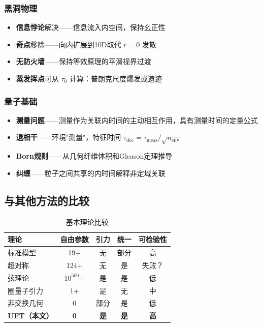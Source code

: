 \subsubsection{黑洞物理}

\begin{itemize}
    \item \textbf{信息悖论}解决——信息流入内空间，保持幺正性
    \item \textbf{奇点}移除——向内扩展到10D取代 $r=0$ 发散
    \item \textbf{无防火墙}——保持等效原理的平滑视界过渡
    \item \textbf{蒸发挥点}可从 $\tau_0$ 计算：普朗克尺度爆发或遗迹
\end{itemize}

\subsubsection{量子基础}

\begin{itemize}
    \item \textbf{测量问题}——测量作为关联内时间的主动相互作用，具有测量时间的定量公式
    \item \textbf{退相干}——环境"测量"，特征时间 $\tau_{\text{dec}} = \tau_{\text{meas}}/\sqrt{n_{\text{env}}}$
    \item \textbf{Born规则}——从几何纤维体积和Gleason定理推导
    \item \textbf{纠缠}——粒子之间共享的内时间解释非定域关联
\end{itemize}

\subsection{与其他方法的比较}

\begin{table}[htbp]
\centering
\caption{基本理论比较}
\begin{tabular}{@{}lcccc@{}}
\toprule
\textbf{理论} & \textbf{自由参数} & \textbf{引力} & \textbf{统一} & \textbf{可检验性} \\
\midrule
标准模型 & 19+ & 无 & 部分 & 高 \\
超对称 & 124+ & 无 & 是 & 失败？ \\
弦理论 & $10^{500}$+ & 是 & 是 & 低 \\
圈量子引力 & 1+ & 是 & 无 & 中 \\
非交换几何 & 0 & 部分 & 是 & 低 \\
\textbf{UFT（本文）} & \textbf{0} & \textbf{是} & \textbf{是} & \textbf{高} \\
\bottomrule
\end{tabular}
\end{table}

